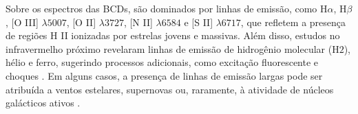 

Sobre os espectros das BCDs, são dominados por linhas de emissão, como H$\alpha$, H$\beta$, [O III] $\lambda 5007$, [O II] $\lambda 3727$, [N II] $\lambda 6584$ e [S II] $\lambda 6717$, que refletem a presença de regiões H II ionizadas por estrelas jovens e massivas. Além disso, estudos no infravermelho próximo revelaram linhas de emissão de hidrogênio molecular (H$2$), hélio e ferro, sugerindo processos adicionais, como excitação fluorescente e choques \citep{Izotov_2011}. Em alguns casos, a presença de linhas de emissão largas pode ser atribuída a ventos estelares, supernovas ou, raramente, à atividade de núcleos galácticos ativos \citep{Izotov_2007}.


